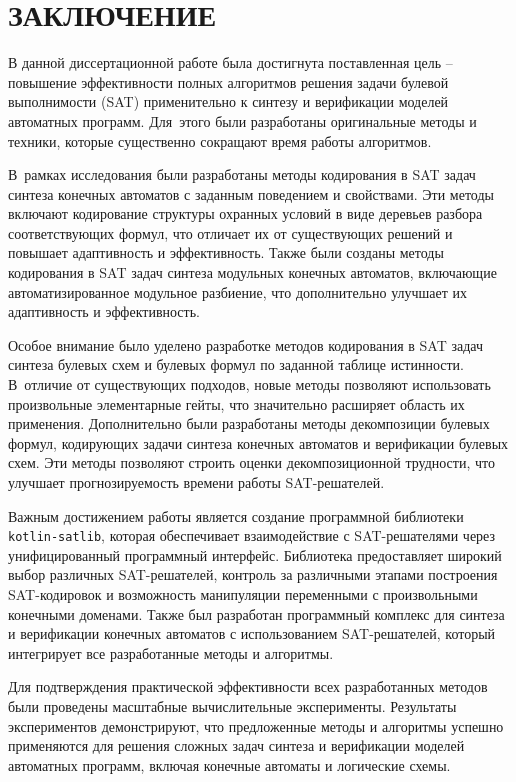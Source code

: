 \chapter*{ЗАКЛЮЧЕНИЕ}

В данной диссертационной работе была достигнута поставленная цель \--- повышение эффективности полных алгоритмов решения задачи булевой выполнимости (SAT) применительно к синтезу и верификации моделей автоматных программ.
Для~этого были разработаны оригинальные методы и техники, которые существенно сокращают время работы алгоритмов.

В~рамках исследования были разработаны методы кодирования в SAT задач синтеза конечных автоматов с заданным поведением и свойствами.
Эти методы включают кодирование структуры охранных условий в виде деревьев разбора соответствующих формул, что отличает их от существующих решений и повышает адаптивность и эффективность.
Также были созданы методы кодирования в SAT задач синтеза модульных конечных автоматов, включающие автоматизированное модульное разбиение, что дополнительно улучшает их адаптивность и эффективность.

Особое внимание было уделено разработке методов кодирования в SAT задач синтеза булевых схем и булевых формул по заданной таблице истинности.
В~отличие от существующих подходов, новые методы позволяют использовать произвольные элементарные гейты, что значительно расширяет область их применения.
Дополнительно были разработаны методы декомпозиции булевых формул, кодирующих задачи синтеза конечных автоматов и верификации булевых схем.
Эти методы позволяют строить оценки декомпозиционной трудности, что улучшает прогнозируемость времени работы SAT-решателей.

Важным достижением работы является создание программной библиотеки \texttt{kotlin-satlib}, которая обеспечивает взаимодействие с SAT-решателями через унифицированный программный интерфейс.
Библиотека предоставляет широкий выбор различных SAT-решателей, контроль за различными этапами построения SAT-кодировок и возможность манипуляции переменными с произвольными конечными доменами.
Также был разработан программный комплекс  для синтеза и верификации конечных автоматов с использованием SAT-решателей, который интегрирует все разработанные методы и алгоритмы.

Для подтверждения практической эффективности всех разработанных методов были проведены масштабные вычислительные эксперименты.
Результаты экспериментов демонстрируют, что предложенные методы и алгоритмы успешно применяются для решения сложных задач синтеза и верификации моделей автоматных программ, включая конечные автоматы и логические схемы.

